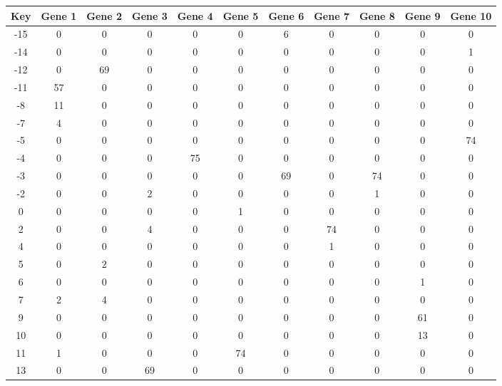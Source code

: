\begin{tabular}{|c|c|c|c|c|c|c|c|c|c|c|}
\hline
Key & Gene 1 & Gene 2 & Gene 3 & Gene 4 & Gene 5 & Gene 6 & Gene 7 & Gene 8 & Gene 9 & Gene 10 \\
\hline
-15 & 0 & 0 & 0 & 0 & 0 & 6 & 0 & 0 & 0 & 0 \\
-14 & 0 & 0 & 0 & 0 & 0 & 0 & 0 & 0 & 0 & 1 \\
-12 & 0 & 69 & 0 & 0 & 0 & 0 & 0 & 0 & 0 & 0 \\
-11 & 57 & 0 & 0 & 0 & 0 & 0 & 0 & 0 & 0 & 0 \\
-8 & 11 & 0 & 0 & 0 & 0 & 0 & 0 & 0 & 0 & 0 \\
-7 & 4 & 0 & 0 & 0 & 0 & 0 & 0 & 0 & 0 & 0 \\
-5 & 0 & 0 & 0 & 0 & 0 & 0 & 0 & 0 & 0 & 74 \\
-4 & 0 & 0 & 0 & 75 & 0 & 0 & 0 & 0 & 0 & 0 \\
-3 & 0 & 0 & 0 & 0 & 0 & 69 & 0 & 74 & 0 & 0 \\
-2 & 0 & 0 & 2 & 0 & 0 & 0 & 0 & 1 & 0 & 0 \\
0 & 0 & 0 & 0 & 0 & 1 & 0 & 0 & 0 & 0 & 0 \\
2 & 0 & 0 & 4 & 0 & 0 & 0 & 74 & 0 & 0 & 0 \\
4 & 0 & 0 & 0 & 0 & 0 & 0 & 1 & 0 & 0 & 0 \\
5 & 0 & 2 & 0 & 0 & 0 & 0 & 0 & 0 & 0 & 0 \\
6 & 0 & 0 & 0 & 0 & 0 & 0 & 0 & 0 & 1 & 0 \\
7 & 2 & 4 & 0 & 0 & 0 & 0 & 0 & 0 & 0 & 0 \\
9 & 0 & 0 & 0 & 0 & 0 & 0 & 0 & 0 & 61 & 0 \\
10 & 0 & 0 & 0 & 0 & 0 & 0 & 0 & 0 & 13 & 0 \\
11 & 1 & 0 & 0 & 0 & 74 & 0 & 0 & 0 & 0 & 0 \\
13 & 0 & 0 & 69 & 0 & 0 & 0 & 0 & 0 & 0 & 0 \\
\hline
\end{tabular}